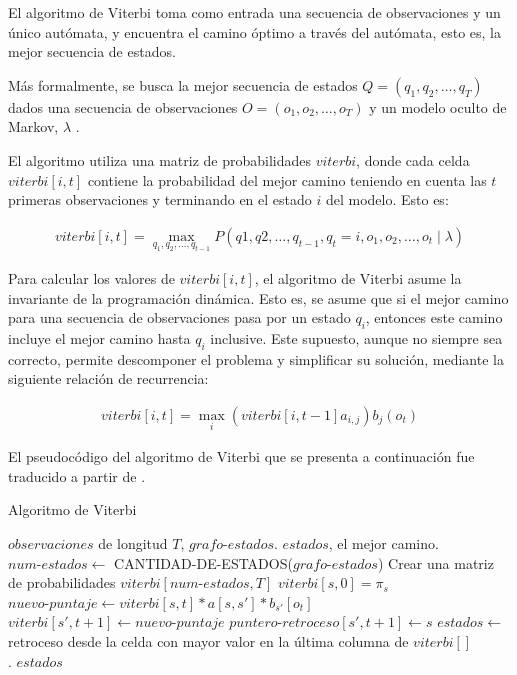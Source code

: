 El algoritmo de Viterbi toma como entrada una secuencia de observaciones y un \'unico aut\'omata, 
y encuentra el camino \'optimo a trav\'es del aut\'omata, esto es, la mejor secuencia de estados. 

M\'as formalmente, se busca la mejor secuencia de estados $Q = (q_1,q_2,\ldots,q_T)$ 
dados una secuencia de observaciones $O = (o_1,o_2,\ldots,o_T)$ y un modelo oculto de 
Markov, $\lambda$ \cite{Jurafsky}.

El algoritmo utiliza una matriz de probabilidades $viterbi$, donde cada celda $viterbi[i,t]$ 
contiene la probabilidad del mejor camino teniendo en cuenta las $t$ primeras observaciones y 
terminando en el estado $i$ del modelo. Esto es:

\begin{align}
	viterbi[i,t] = \displaystyle \max_{q_1,q_2,\ldots,q_{t - 1}} P(q1,q2,\ldots,q_{t - 1},
		q_t = i,o_1,o_2,\ldots,o_t \mid \lambda) 	
\end{align} 

Para calcular los valores de $viterbi[i,t]$, el algoritmo de Viterbi asume la invariante de la 
programaci\'on din\'amica. Esto es, se asume que si el mejor camino para una secuencia de observaciones 
pasa por un estado $q_i$, entonces este camino incluye el mejor camino hasta $q_i$ inclusive. 
Este supuesto, aunque no siempre sea correcto, permite descomponer el problema y simplificar su soluci\'on,
mediante la siguiente relaci\'on de recurrencia:

\begin{align}
	viterbi[i,t] = \displaystyle \max_i (viterbi[i,t-1]a_{i,j})b_j(o_t)
\end{align}

El pseudocódigo del algoritmo de Viterbi que se presenta a continuación fue traducido a partir de
\cite{Rabiner89atutorial}.

\begin{algorithm}[H]
\caption{Algoritmo de Viterbi} \label{viterbi}
\begin{algorithmic}[1]
\REQUIRE $observaciones$ de longitud $T$, $grafo\mbox{-}estados$.
\ENSURE $estados$, el mejor camino.
\STATE $num\mbox{-}estados \leftarrow$ CANTIDAD-DE-ESTADOS($grafo\mbox{-}estados$) 
\STATE Crear una matriz de probabilidades $viterbi[num\mbox{-}estados, T]$
	\STATE $viterbi[s,0] = \pi_s$
\ENDFOR
{}
		\STATE $nuevo\mbox{-}puntaje \leftarrow viterbi[s,t] * a[s,s'] * b_{s'}[o_t]$
			\STATE $viterbi[s',t+1] \leftarrow nuevo\mbox{-}puntaje$
			\STATE $puntero\mbox{-}retroceso[s',t+1] \leftarrow s$
		\ENDIF  
		\ENDFOR
	\ENDFOR
\ENDFOR
\STATE $estados \leftarrow$ retroceso desde la celda con mayor valor en la \'ultima columna de $viterbi[]$
\\ .
\RETURN $estados$
\end{algorithmic}
\end{algorithm}

